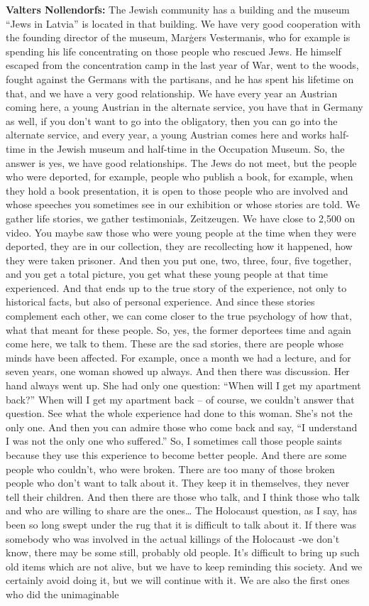 \textbf{Valters Nollendorfs:} The Jewish community has a building and the museum “Jews in Latvia” is located in that building. We have very good cooperation with the founding director of the museum, Marģers Vestermanis, who for example is spending his life concentrating on those people who rescued Jews. He himself escaped from the concentration camp in the last year of War, went to the woods, fought against the Germans with the partisans, and he has spent his lifetime on that, and we have a very good relationship. We have every year an Austrian coming here, a young Austrian in the alternate service, you have that in Germany as well, if you don't want to go into the obligatory, then you can go into the alternate service, and every year, a young Austrian comes here and works half-time in the Jewish museum and half-time in the Occupation Museum. So, the answer is yes, we have good relationships. The Jews do not meet, but the people who were deported, for example, people who publish a book, for example, when they hold a book presentation, it is open to those people who are involved and whose speeches you sometimes see in our exhibition or whose stories are told. We gather life stories, we gather testimonials, Zeitzeugen. We have close to 2,500 on video. You maybe saw those who were young people at the time when they were deported, they are in our collection, they are recollecting how it happened, how they were taken prisoner. And then you put one, two, three, four, five together, and you get a total picture, you get what these young people at that time experienced. And that ends up to the true story of the experience, not only to historical facts, but also of personal experience. And since these stories complement each other, we can come closer to the true psychology of how that, what that meant for these people. So, yes, the former deportees time and again come here, we talk to them. These are the sad stories, there are people whose minds have been affected. For example, once a month we had a lecture, and for seven years, one woman showed up always. And then there was discussion. Her hand always went up. She had only one question: “When will I get my apartment back?” When will I get my apartment back – of course, we couldn’t answer that question. See what the whole experience had done to this woman. She’s not the only one. And then you can admire those who come back and say, “I understand I was not the only one who suffered.” So, I sometimes call those people saints because they use this experience to become better people. And there are some people who couldn’t, who were broken. There are too many of those broken people who don’t want to talk about it. They keep it in themselves, they never tell their children. And then there are those who talk, and I think those who talk and who are willing to share are the ones… The Holocaust question, as I say, has been so long swept under the rug that it is difficult to talk about it. If there was somebody who was involved in the actual killings of the Holocaust -we don’t know, there may be some still, probably old people. It’s difficult to bring up such old items which are not alive, but we have to keep reminding this society. And we certainly avoid doing it, but we will continue with it. We are also the first ones who did the unimaginable 